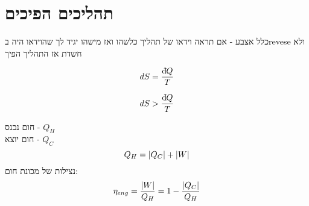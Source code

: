 \section{תהליכים הפיכים}
כלל אצבע - אם תראה וידאו של תהליך כלשהו ואז מישהו יגיד לך שהוידאו היה בrevese ולא חשדת אז התהליך הפיך
\begin{cheatformula}
    $$dS = \frac{\mathrm{d}\hspace*{-0.1405em}\bar{}\hspace*{0.1em} Q}{T}$$
\end{cheatformula}

\begin{cheatformula}
    $$dS > \frac{\mathrm{d}\hspace*{-0.1405em}\bar{}\hspace*{0.1em} Q}{T}$$
\end{cheatformula}

\begin{cheatformula}
    חום נכנס - $Q_H$ \\
    חום יוצא - $Q_C$
    $$Q_H = \abs{Q_C} + \abs{W} $$
    נצילות של מכונת חום:
    $$\eta_{eng} = \frac{\abs{W}}{Q_H} = 1 - \frac{\abs{Q_C}}{Q_H}$$
\end{cheatformula}
